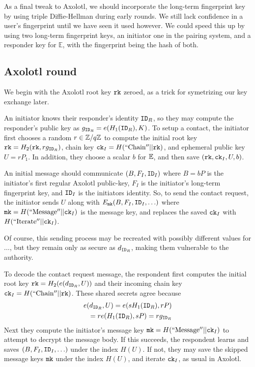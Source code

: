 \documentclass[twoside,letterpaper]{sig-alternate}
\begin{document}
As a final tweak to Axolotl, we should incorporate the long-term
fingerprint key by using triple Diffie-Hellman during early rounds.
We still lack confidence in a user's fingerprint until
we have seen it used however.
We could speed this up by using two long-term fingerprint keys,
an initiator one in the pairing system, and
 a responder key for $\mathbb{E}$,
with the fingerprint being the hash of both.

\subsection{Axolotl round} %

We begin with the Axolotl root key $\mathtt{rk}$ zeroed,
 as a trick for symetrizing our key exchange later. 

An initiator knows their responder's identity $\mathtt{ID}_R$, so they may
compute the responder's public key as $g_{\mathtt{ID}_R} = e(H_1(\mathtt{ID}_R),K)$.
To setup a contact, the initiator first chooses a random $r \in \mathbb{Z}/q\mathbb{Z}$
to compute the initial root key $\mathtt{rk} = H_2(\mathtt{rk}, r g_{\mathtt{ID}_R} )$,
chain key $\mathtt{ck}_I = H(\mathrm{``Chain''} || \mathtt{rk})$, and
ephemeral public key $U = r P_1$.
In addition, they choose a scalar $b$ for $\mathbb{E}$,
 and then save $(\mathtt{rk},\mathtt{ck}_I,U,b)$.

An initial message should communicate $(B,F_I,\mathtt{ID}_I)$ where
 $B = b P$ is the initiator's first regular Axolotl public-key,
 $F_I$ is the initiator's long-term fingerprint key, and
 $\mathtt{ID}_I$ is the initiators identity.
So, to send the contact request, the initiator
sends $U$ along with $E_{\mathtt{mk}}(B,F_I,\mathtt{ID}_I,\ldots)$ where
 $\mathtt{mk} = H(\mathrm{``Message''}  || \mathtt{ck}_I)$ is the message key,
and replaces the saved $\mathtt{ck}_I$ with $H(\mathrm{``Iterate''} || \mathtt{ck}_I)$.

Of course, this sending process may be recreated with possibly different
values for $\ldots$, but they remain only as secure as $d_{\mathtt{ID}_R}$,
making them vulnerable to the authority.

\smallskip

To decode the contact request message, the respondent
first computes the initial root key $\mathtt{rk} = H_2( e(d_{\mathtt{ID}_R}, U) )$
and their incoming chain key $\mathtt{ck}_I = H(\mathrm{``Chain''} || \mathtt{rk})$.
These shared secrets agree because
\begin{align*}
e(d_{\mathtt{ID}_R}, U) = e(s H_1(\mathtt{ID}_R), r P) \\
 \quad = r e(H_1(\mathtt{ID}_R), s P) = r g_{\mathtt{ID}_R}
\end{align*}
Next they compute the initiator's
 message key $\mathtt{mk} = H(\mathrm{``Message''}  || \mathtt{ck}_I)$
to attempt to decrypt the message body.
If this succeeds, the respondent learns and saves $(B,F_I,\mathtt{ID}_I,\ldots)$
 under the index $H(U)$.
If not, they may save the skipped message keys $\mathtt{mk}$ under
the index $H(U)$, and iterate $\mathtt{ck}_I$, as usual in Axolotl.
\end{document}
